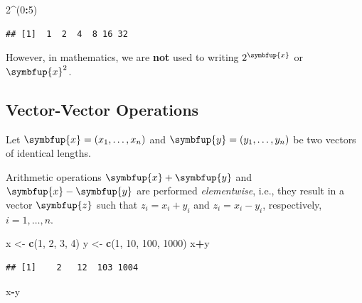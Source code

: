 \documentclass[10pt,b5paper,krantz1]{krantz}
\newenvironment{Shaded}{\begin{snugshade}}{\end{snugshade}}
\newcommand{\DecValTok}[1]{\textcolor[rgb]{0.06,0.06,0.06}{#1}}
\newcommand{\KeywordTok}[1]{\textcolor[rgb]{0.27,0.27,0.27}{\textbf{#1}}}
\newcommand{\NormalTok}[1]{#1}
\newcommand{\OperatorTok}[1]{\textcolor[rgb]{0.43,0.43,0.43}{\textbf{#1}}}
\newcommand{\StringTok}[1]{\textcolor[rgb]{0.5,0.5,0.5}{#1}}
\renewcommand{\boldsymbol}[1]{\symbfup{#1}}
\begin{document}
\begin{Shaded}
\begin{Highlighting}[]
\DecValTok{2}\OperatorTok{^}\NormalTok{(}\DecValTok{0}\OperatorTok{:}\DecValTok{5}\NormalTok{)}
\end{Highlighting}
\end{Shaded}

\begin{verbatim}
## [1]  1  2  4  8 16 32
\end{verbatim}

However, in mathematics, we are \textbf{not} used to writing
\(2^{\boldsymbol{x}}\) or \(\boldsymbol{x}^2\).

\hypertarget{vector-vector-operations}{%
\subsection{Vector-Vector Operations}\label{vector-vector-operations}}

Let \(\boldsymbol{x}=(x_1,\dots,x_n)\) and \(\boldsymbol{y}=(y_1,\dots,y_n)\) be two vectors of identical lengths.

Arithmetic operations \(\boldsymbol{x}+\boldsymbol{y}\) and \(\boldsymbol{x}-\boldsymbol{y}\) are performed \emph{elementwise},
i.e., they result in a vector \(\boldsymbol{z}\) such that
\(z_i=x_i+y_i\) and \(z_i=x_i-y_i\), respectively, \(i=1,\dots,n\).

\begin{Shaded}
\begin{Highlighting}[]
\NormalTok{x <-}\StringTok{ }\KeywordTok{c}\NormalTok{(}\DecValTok{1}\NormalTok{,  }\DecValTok{2}\NormalTok{,   }\DecValTok{3}\NormalTok{,    }\DecValTok{4}\NormalTok{)}
\NormalTok{y <-}\StringTok{ }\KeywordTok{c}\NormalTok{(}\DecValTok{1}\NormalTok{, }\DecValTok{10}\NormalTok{, }\DecValTok{100}\NormalTok{, }\DecValTok{1000}\NormalTok{)}
\NormalTok{x}\OperatorTok{+}\NormalTok{y}
\end{Highlighting}
\end{Shaded}

\begin{verbatim}
## [1]    2   12  103 1004
\end{verbatim}

\begin{Shaded}
\begin{Highlighting}[]
\NormalTok{x}\OperatorTok{-}\NormalTok{y}
\end{Highlighting}
\end{Shaded}
\end{document}
